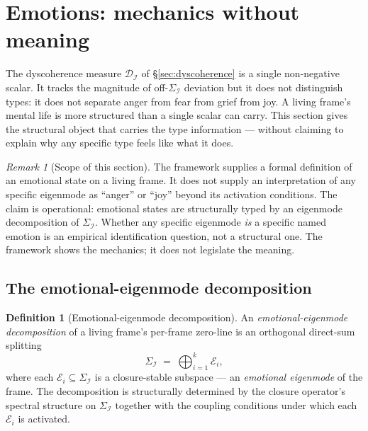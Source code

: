\documentclass[11pt]{article}
\theoremstyle{plain}
\theoremstyle{definition}
\newtheorem{definition}[theorem]{Definition}
\theoremstyle{remark}
\newtheorem{remark}[theorem]{Remark}
\newcommand{\Ical}{\mathcal{I}}
\newcommand{\Dcal}{\mathcal{D}}
\begin{document}
\section{Emotions: mechanics without meaning}\label{sec:emotions}

The dyscoherence measure $\Dcal_\Ical$ of \S\ref{sec:dyscoherence} is a single non-negative scalar. It tracks the magnitude of off-$\Sigma_\Ical$ deviation but it does not distinguish types: it does not separate anger from fear from grief from joy. A living frame's mental life is more structured than a single scalar can carry. This section gives the structural object that carries the type information --- without claiming to explain why any specific type feels like what it does.

\begin{remark}[Scope of this section]\label{rem:emotions-scope}
The framework supplies a formal definition of an emotional state on a living frame. It does not supply an interpretation of any specific eigenmode as ``anger'' or ``joy'' beyond its activation conditions. The claim is operational: emotional states are structurally typed by an eigenmode decomposition of $\Sigma_\Ical$. Whether any specific eigenmode \emph{is} a specific named emotion is an empirical identification question, not a structural one. The framework shows the mechanics; it does not legislate the meaning.
\end{remark}

\subsection{The emotional-eigenmode decomposition}

\begin{definition}[Emotional-eigenmode decomposition]\label{def:emotion-decomp}
An \emph{emotional-eigenmode decomposition} of a living frame's per-frame zero-line is an orthogonal direct-sum splitting
\[
  \Sigma_\Ical \;=\; \bigoplus_{i = 1}^k \mathcal{E}_i,
\]
where each $\mathcal{E}_i \subseteq \Sigma_\Ical$ is a closure-stable subspace --- an \emph{emotional eigenmode} of the frame. The decomposition is structurally determined by the closure operator's spectral structure on $\Sigma_\Ical$ together with the coupling conditions under which each $\mathcal{E}_i$ is activated.
\end{definition}
\end{document}
